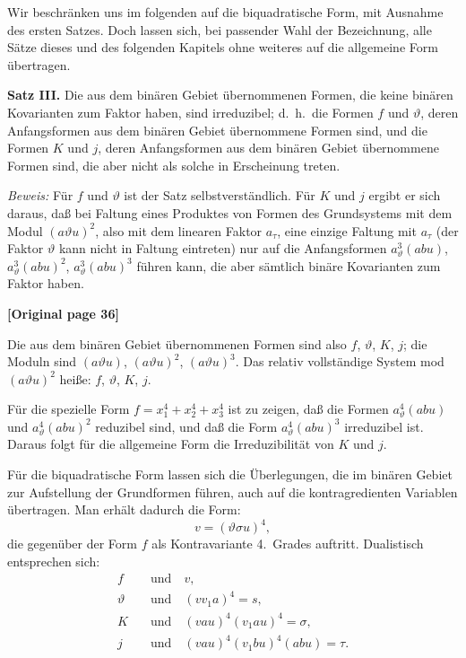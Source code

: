 \documentclass[12pt,a4paper]{article}
\begin{document}
Wir beschränken uns im folgenden auf die biquadratische Form, mit Ausnahme des ersten Satzes. Doch lassen sich, bei passender Wahl der Bezeichnung, alle Sätze dieses und des folgenden Kapitels ohne weiteres auf die allgemeine Form übertragen.

\textbf{Satz III.} Die aus dem binären Gebiet übernommenen Formen, die keine binären Kovarianten zum Faktor haben, sind irreduzibel; d.\ h.\ die Formen $f$ und $\vartheta$, deren Anfangsformen aus dem binären Gebiet übernommene Formen sind, und die Formen $K$ und $j$, deren Anfangsformen aus dem binären Gebiet übernommene Formen sind, die aber nicht als solche in Erscheinung treten.

\textit{Beweis:} Für $f$ und $\vartheta$ ist der Satz selbstverständlich. Für $K$ und $j$ ergibt er sich daraus, daß bei Faltung eines Produktes von Formen des Grundsystems mit dem Modul $(a\vartheta u)^2$, also mit dem linearen Faktor $a_\tau$, eine einzige Faltung mit $a_\tau$ (der Faktor $\vartheta$ kann nicht in Faltung eintreten) nur auf die Anfangsformen $a_\vartheta^3 (abu)$, $a_\vartheta^3 (abu)^2$, $a_\vartheta^3 (abu)^3$ führen kann, die aber sämtlich binäre Kovarianten zum Faktor haben.

\noindent\textbf{[Original page 36]}

Die aus dem binären Gebiet übernommenen Formen sind also $f$, $\vartheta$, $K$, $j$; die Moduln sind $(a\vartheta u)$, $(a\vartheta u)^2$, $(a\vartheta u)^3$. Das relativ vollständige System mod $(a\vartheta u)^2$ heiße: $f$, $\vartheta$, $K$, $j$.

Für die spezielle Form $f = x_1^4 + x_2^4 + x_3^4$ ist zu zeigen, daß die Formen $a_\vartheta^4 (abu)$ und $a_\vartheta^4 (abu)^2$ reduzibel sind, und daß die Form $a_\vartheta^4 (abu)^3$ irreduzibel ist. Daraus folgt für die allgemeine Form die Irreduzibilität von $K$ und $j$.

Für die biquadratische Form lassen sich die Überlegungen, die im binären Gebiet zur Aufstellung der Grundformen führen, auch auf die kontragredienten Variablen übertragen. Man erhält dadurch die Form:
\[v = (\vartheta \sigma u)^4,\]
die gegenüber der Form $f$ als Kontravariante 4.\ Grades auftritt. Dualistisch entsprechen sich:
\begin{align*}
f &\quad\text{und}\quad v,\\
\vartheta &\quad\text{und}\quad (vv_1 a)^4 = s,\\
K &\quad\text{und}\quad (v a u)^4 (v_1 a u)^4 = \sigma,\\
j &\quad\text{und}\quad (v a u)^4 (v_1 b u)^4 (abu) = \tau.
\end{align*}
\end{document}
